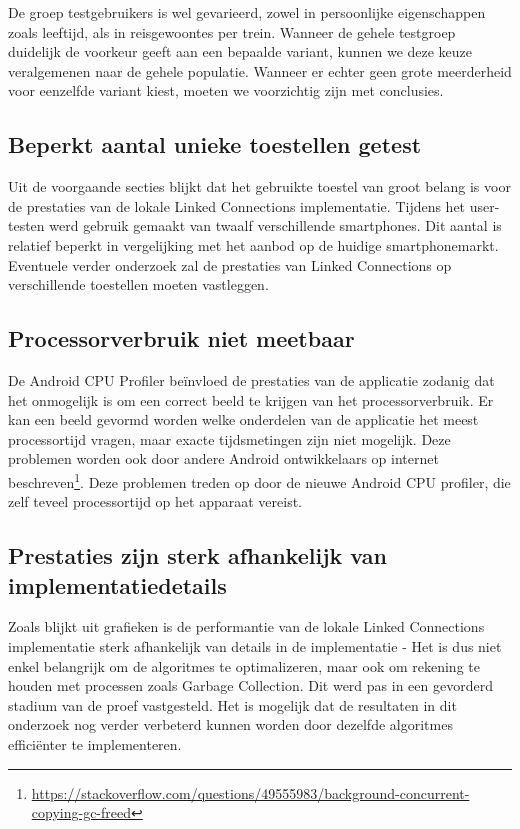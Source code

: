 De groep testgebruikers is wel gevarieerd, zowel in persoonlijke eigenschappen zoals leeftijd, als in reisgewoontes per trein. Wanneer de gehele testgroep duidelijk de voorkeur geeft aan een bepaalde variant, kunnen we deze keuze veralgemenen naar de gehele populatie. Wanneer er echter geen grote meerderheid voor eenzelfde variant kiest, moeten we voorzichtig zijn met conclusies.

\subsection{Beperkt aantal unieke toestellen getest}
Uit de voorgaande secties blijkt dat het gebruikte toestel van groot belang is voor de prestaties van de lokale Linked Connections implementatie. Tijdens het user-testen werd gebruik gemaakt van twaalf verschillende smartphones. Dit aantal is relatief beperkt in vergelijking met het aanbod op de huidige smartphonemarkt. Eventuele verder onderzoek zal de prestaties van Linked Connections op verschillende toestellen moeten vastleggen.

\subsection{Processorverbruik niet meetbaar}
De Android CPU Profiler beïnvloed de prestaties van de applicatie zodanig dat het onmogelijk is om een correct beeld te krijgen van het processorverbruik. Er kan een beeld gevormd worden welke onderdelen van de applicatie het meest processortijd vragen, maar exacte tijdsmetingen zijn niet mogelijk. Deze problemen worden ook door andere Android ontwikkelaars op internet beschreven\footnote{\url{https://stackoverflow.com/questions/49555983/background-concurrent-copying-gc-freed}}. Deze problemen treden op door de nieuwe Android CPU profiler, die zelf teveel processortijd op het apparaat vereist.

\subsection{Prestaties zijn sterk afhankelijk van implementatiedetails}
Zoals blijkt uit grafieken %
is de performantie van de lokale Linked Connections implementatie sterk afhankelijk van details in de implementatie - Het is dus niet enkel belangrijk om de algoritmes te optimalizeren, maar ook om rekening te houden met processen zoals Garbage Collection. Dit werd pas in een gevorderd stadium van de proef vastgesteld. Het is mogelijk dat de resultaten in dit onderzoek nog verder verbeterd kunnen worden door dezelfde algoritmes efficiënter te implementeren.

